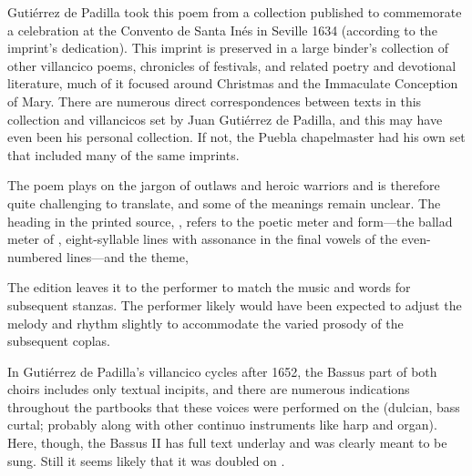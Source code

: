 \begin{notesources}
    \begin{source}
    \end{source}
    \begin{source}
    \end{source}
\end{notesources}

Gutiérrez de Padilla took this poem from a collection published to commemorate
a celebration at the Convento de Santa Inés in Seville 1634 (according to the
imprint's dedication). 
This imprint is preserved in a large binder's collection of other villancico
poems, chronicles of festivals, and related poetry and devotional literature,
much of it focused around Christmas and the Immaculate Conception of Mary.
There are numerous direct correspondences between texts in this collection and
villancicos set by Juan Gutiérrez de Padilla, and this may have even been his
personal collection.
If not, the Puebla chapelmaster had his own set that included many of the same
imprints.

The poem plays on the jargon of outlaws and heroic warriors and is therefore
quite challenging to translate, and some of the meanings remain unclear.
The heading in the printed source, , refers to
the poetic meter and form---the ballad meter of , eight-syllable
lines with assonance in the final vowels of the even-numbered lines---and the
theme, 

The edition leaves it to the performer to match the music and words for
subsequent stanzas. 
The performer likely would have been expected to adjust the melody and rhythm
slightly to accommodate the varied prosody of the subsequent coplas.

In Gutiérrez de Padilla's villancico cycles after 1652, the Bassus part of
both choirs includes only textual incipits, and there are numerous indications
throughout the partbooks that these voices were performed on the 
(dulcian, bass curtal; probably along with other continuo instruments like
harp and organ).
Here, though, the Bassus II has full text underlay and was clearly meant to be
sung.
Still it seems likely that it was doubled on .


\endinput
